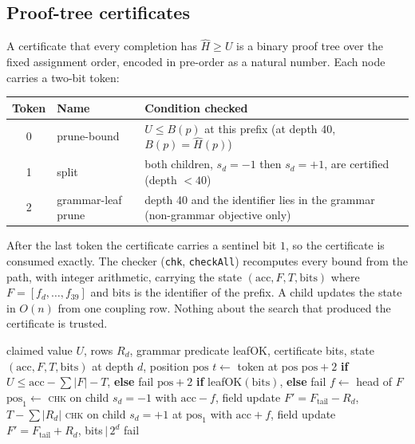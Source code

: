\documentclass[11pt,a4paper]{article}
\theoremstyle{plain}
\theoremstyle{definition}
\theoremstyle{remark}
\newcommand{\lean}[1]{\nolinkurl{#1}}
\begin{document}
\subsection{Proof-tree certificates}\label{sec:cert}
A certificate that every completion has $\hat H\ge U$ is a binary proof tree over the fixed assignment order, encoded in pre-order as a natural number. Each node carries a two-bit token:
\begin{center}\small
\begin{tabular}{@{}cll@{}}
\toprule
Token & Name & Condition checked\\
\midrule
0 & prune-bound & $U\le B(p)$ at this prefix (at depth 40, $B(p)=\hat H(p)$)\\
1 & split & both children, $s_d=-1$ then $s_d=+1$, are certified (depth $<40$)\\
2 & grammar-leaf prune & depth 40 and the identifier lies in the grammar (non-grammar objective only)\\
\bottomrule
\end{tabular}
\end{center}
After the last token the certificate carries a sentinel bit $1$, so the certificate is consumed exactly. The checker (\lean{chk}, \lean{checkAll}) recomputes every bound from the path, with integer arithmetic, carrying the state $(\mathrm{acc},F,T,\mathrm{bits})$ where $F=[f_d,\dots,f_{39}]$ and $\mathrm{bits}$ is the identifier of the prefix. A child updates the state in $O(n)$ from one coupling row. Nothing about the search that produced the certificate is trusted.

\begin{algorithm}[t]
\caption{Checker \lean{chk} (schematic). Recomputes every bound exactly; accepts a subtree only if the token is justified.}
\label{alg:chk}
\begin{algorithmic}[1]
\Require claimed value $U$, rows $R_d$, grammar predicate \textsf{leafOK}, certificate bits, state $(\mathrm{acc},F,T,\mathrm{bits})$ at depth $d$, position $\mathrm{pos}$
\State $t\gets$ token at $\mathrm{pos}$
  \State \Return $\mathrm{pos}+2$ \textbf{if} $U\le \mathrm{acc}-\sum|F|-T$, \textbf{else} fail
  \State \Return $\mathrm{pos}+2$ \textbf{if} \textsf{leafOK}$(\mathrm{bits})$, \textbf{else} fail
  \State $f\gets$ head of $F$
  \State $\mathrm{pos}_1\gets$ \textsc{chk} on child $s_d=-1$ with $\mathrm{acc}-f$, field update $F'=F_{\text{tail}}-R_d$, $T-\sum|R_d|$
  \State \Return \textsc{chk} on child $s_d=+1$ at $\mathrm{pos}_1$ with $\mathrm{acc}+f$, field update $F'=F_{\text{tail}}+R_d$, bits$\,|\,2^d$
\Else
  \State fail
\EndIf
\end{algorithmic}
\end{algorithm}
\end{document}

